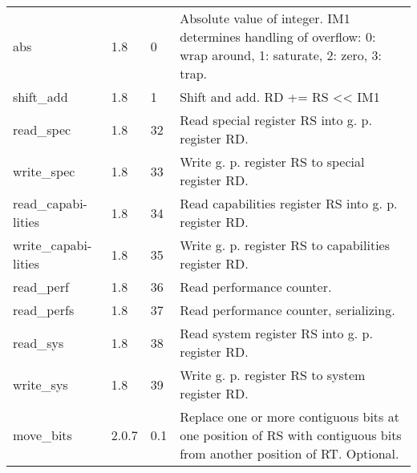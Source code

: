 \documentclass[forwardcom.tex]{subfiles}
\begin{document}
\begin{longtable} {|p{20mm}|p{10mm}|p{8mm}|p{75mm}|}
abs           & 1.8   &  0  & Absolute value of integer. IM1 determines handling of overflow: 0: wrap around, 1: saturate, 2: zero, 3: trap. \\
shift\_add    & 1.8   &  1  & Shift and add. RD += RS \textless\textless{} IM1 \\
read\_spec    & 1.8   & 32  & Read special register RS into g. p. register RD. \\
write\_spec   & 1.8   & 33  & Write g. p. register RS to special register RD. \\
read\_capabi-lities & 1.8   & 34  & Read capabilities register RS into g. p. register RD. \\
write\_capabi-lities & 1.8   & 35  & Write g. p. register RS to capabilities register RD. \\
read\_perf    & 1.8   & 36  & Read performance counter. \\
read\_perfs   & 1.8   & 37  & Read performance counter, serializing. \\
read\_sys     & 1.8   & 38  & Read system register RS into g. p. register RD. \\
write\_sys    & 1.8   & 39  & Write g. p. register RS to system register RD. \\

move\_bits    & 2.0.7 & 0.1 & Replace one or more contiguous bits at one position of RS with contiguous bits from another position of RT. Optional. \\


\end{longtable}
\end{document}
